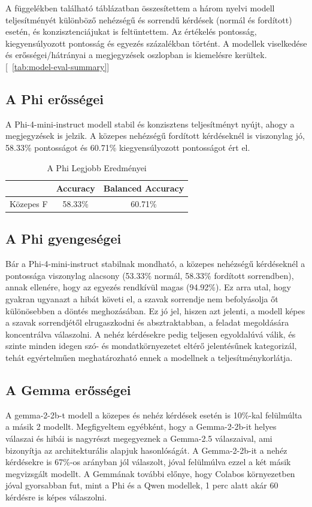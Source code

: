\documentclass[12pt]{report}
\theoremstyle{definition}
\begin{document}
A függelékben található táblázatban összesítettem a három nyelvi modell teljesítményét különböző nehézségű és sorrendű kérdések (normál és fordított) esetén, és konzisztenciájukat is feltüntettem. Az értékelés pontosság, kiegyensúlyozott pontosság és egyezés százalékban történt. A modellek viselkedése és erősségei/hátrányai a megjegyzések oszlopban is kiemelésre kerültek.[~\ref{tab:model-eval-summary}]

\subsection{A Phi erősségei}
A Phi-4-mini-instruct modell stabil és konzisztens teljesítményt nyújt, ahogy a megjegyzések is jelzik. A közepes nehézségű fordított kérdéseknél is viszonylag jó, 58.33\% pontosságot és 60.71\% kiegyensúlyozott pontosságot ért el.

\begin{table}[h]
    \centering
    \begin{tabular}{lcc}
        \hline
        & \textbf{Accuracy} & \textbf{Balanced Accuracy} \\
        \hline
        Közepes F & 58.33\% & 60.71\% \\
        \hline
    \end{tabular}
    \caption{A Phi Legjobb Eredményei}
    \label{tab:accuracy_balanced_accuracy1}
\end{table}

\subsection{A Phi gyengeségei}
Bár a Phi-4-mini-instruct stabilnak mondható, a közepes nehézségű kérdéseknél a pontossága viszonylag alacsony (53.33\% normál, 58.33\% fordított sorrendben), annak ellenére, hogy az egyezés rendkívül magas (94.92\%). Ez arra utal, hogy gyakran ugyanazt a hibát követi el, a szavak sorrendje nem befolyásolja őt különösebben a döntés meghozásában. Ez jó jel, hiszen azt jelenti, a modell képes a szavak sorrendjétől elrugaszkodni és absztraktabban, a feladat megoldására koncentrálva válaszolni. A nehéz kérdésekre pedig teljesen egyoldalúvá válik, és szinte minden idegen szó- és mondatkörnyezetet eltérő jelentésűnek kategorizál, tehát egyértelműen meghatározható ennek a modellnek a teljesítménykorlátja.

\subsection{A Gemma erősségei}
A gemma-2-2b-t modell a közepes és nehéz kérdések esetén is 10\%-kal felülmúlta a másik 2 modellt. Megfigyeltem egyébként, hogy a Gemma-2-2b-it helyes válaszai és hibái is nagyrészt megegyeznek a Gemma-2.5 válaszaival, ami bizonyítja az architekturális alapjuk hasonlóságát. A Gemma-2-2b-it a nehéz kérdésekre is 67\%-os arányban jól válaszolt, jóval felülmúlva ezzel a két másik megvizsgált modellt.
A Gemmának további előnye, hogy Colabos környezetben jóval gyorsabban fut, mint a Phi és a Qwen modellek, 1 perc alatt akár 60 kérdésre is képes válaszolni.
\end{document}
